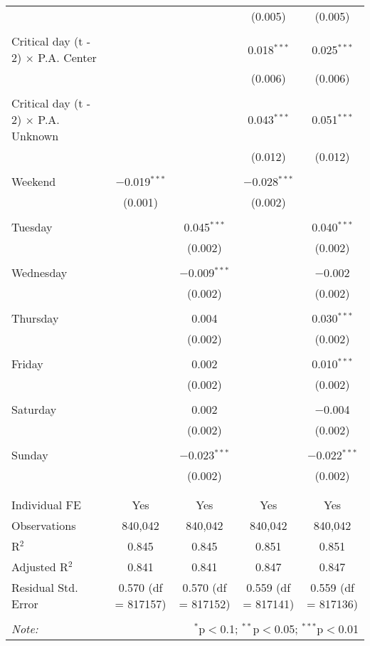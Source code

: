 \documentclass[
]{article}
\begin{document}
\begin{table}[!htbp]
{\begin{tabular}{@{\extracolsep{5pt}}lcccc}
  &  &  & (0.005) & (0.005) \\ 
  & & & & \\ 
 Critical day (t - 2) $\times$ P.A. Center &  &  & 0.018$^{***}$ & 0.025$^{***}$ \\ 
  &  &  & (0.006) & (0.006) \\ 
  & & & & \\ 
 Critical day (t - 2) $\times$ P.A. Unknown &  &  & 0.043$^{***}$ & 0.051$^{***}$ \\ 
  &  &  & (0.012) & (0.012) \\ 
  & & & & \\ 
 Weekend & $-$0.019$^{***}$ &  & $-$0.028$^{***}$ &  \\ 
  & (0.001) &  & (0.002) &  \\ 
  & & & & \\ 
 Tuesday &  & 0.045$^{***}$ &  & 0.040$^{***}$ \\ 
  &  & (0.002) &  & (0.002) \\ 
  & & & & \\ 
 Wednesday &  & $-$0.009$^{***}$ &  & $-$0.002 \\ 
  &  & (0.002) &  & (0.002) \\ 
  & & & & \\ 
 Thursday &  & 0.004 &  & 0.030$^{***}$ \\ 
  &  & (0.002) &  & (0.002) \\ 
  & & & & \\ 
 Friday &  & 0.002 &  & 0.010$^{***}$ \\ 
  &  & (0.002) &  & (0.002) \\ 
  & & & & \\ 
 Saturday &  & 0.002 &  & $-$0.004 \\ 
  &  & (0.002) &  & (0.002) \\ 
  & & & & \\ 
 Sunday &  & $-$0.023$^{***}$ &  & $-$0.022$^{***}$ \\ 
  &  & (0.002) &  & (0.002) \\ 
  & & & & \\ 
\hline \\[-1.8ex] 
Individual FE & Yes & Yes & Yes & Yes \\ 
Observations & 840,042 & 840,042 & 840,042 & 840,042 \\ 
R$^{2}$ & 0.845 & 0.845 & 0.851 & 0.851 \\ 
Adjusted R$^{2}$ & 0.841 & 0.841 & 0.847 & 0.847 \\ 
Residual Std. Error & 0.570 (df = 817157) & 0.570 (df = 817152) & 0.559 (df = 817141) & 0.559 (df = 817136) \\ 
\hline 
\hline \\[-1.8ex] 
\textit{Note:}  & \multicolumn{4}{r}{$^{*}$p$<$0.1; $^{**}$p$<$0.05; $^{***}$p$<$0.01} \\ 
\end{tabular}
} 
\end{table} 
\newpage
\end{document}
